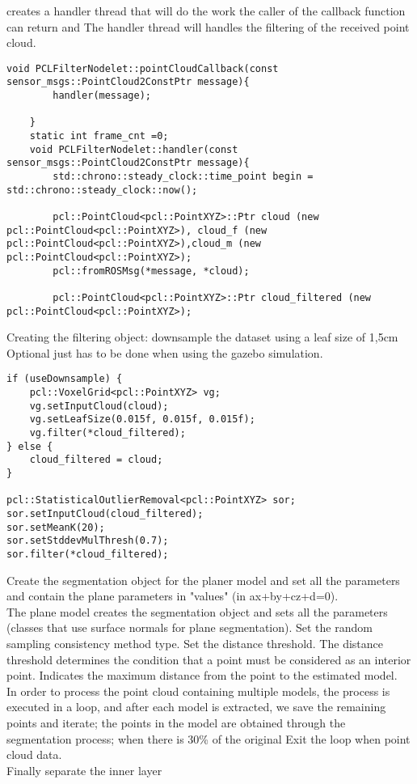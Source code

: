 creates a handler thread that will do the work the caller of the callback function can return and The handler thread will handles the filtering of the received point cloud.
\begin{lstlisting}[caption={}]
void PCLFilterNodelet::pointCloudCallback(const sensor_msgs::PointCloud2ConstPtr message){
		handler(message);
		
	}
	static int frame_cnt =0;
	void PCLFilterNodelet::handler(const sensor_msgs::PointCloud2ConstPtr message){
		std::chrono::steady_clock::time_point begin = std::chrono::steady_clock::now();
		
		pcl::PointCloud<pcl::PointXYZ>::Ptr cloud (new pcl::PointCloud<pcl::PointXYZ>), cloud_f (new pcl::PointCloud<pcl::PointXYZ>),cloud_m (new pcl::PointCloud<pcl::PointXYZ>);
		pcl::fromROSMsg(*message, *cloud);
		
		pcl::PointCloud<pcl::PointXYZ>::Ptr cloud_filtered (new pcl::PointCloud<pcl::PointXYZ>);
\end{lstlisting}


Creating the filtering object: downsample the dataset using a leaf size of 1,5cm Optional just has to be done when using the gazebo simulation.
\begin{lstlisting}[caption={}]
  if (useDownsample) {
	pcl::VoxelGrid<pcl::PointXYZ> vg;
	vg.setInputCloud(cloud);
	vg.setLeafSize(0.015f, 0.015f, 0.015f);
	vg.filter(*cloud_filtered);
} else {
	cloud_filtered = cloud;
}

pcl::StatisticalOutlierRemoval<pcl::PointXYZ> sor;
sor.setInputCloud(cloud_filtered);
sor.setMeanK(20);
sor.setStddevMulThresh(0.7);
sor.filter(*cloud_filtered);
\end{lstlisting}


Create the segmentation object for the planer model and set all the parameters and contain the plane parameters in "values" (in ax+by+cz+d=0).\\
The plane model creates the segmentation object and sets all the parameters (classes that use surface normals for plane segmentation). Set the random sampling consistency method type. Set the distance threshold. The distance threshold determines the condition that a point must be considered as an interior point. Indicates the maximum distance from the point to the estimated model.\\
In order to process the point cloud containing multiple models, the process is executed in a loop, and after each model is extracted, we save the remaining points and iterate; the points in the model are obtained through the segmentation process; when there is 30\% of the original Exit the loop when point cloud data.\\
Finally separate the inner layer\\


